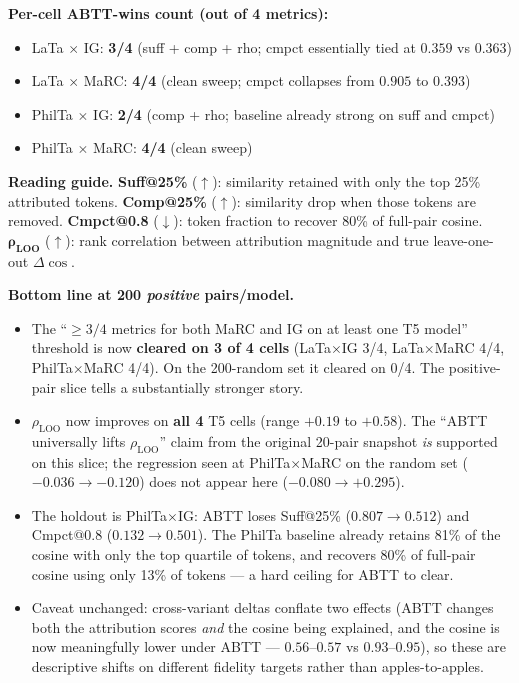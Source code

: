 \documentclass[11pt]{article}
\begin{document}
\vspace{0.4em}

\noindent\textbf{Per-cell ABTT-wins count (out of 4 metrics):}
\begin{itemize}
\itemsep0em
\item LaTa $\times$ IG: \textbf{3/4} (suff + comp + rho; cmpct essentially tied at $0.359$ vs $0.363$)
\item LaTa $\times$ MaRC: \textbf{4/4} (clean sweep; cmpct collapses from $0.905$ to $0.393$)
\item PhilTa $\times$ IG: \textbf{2/4} (comp + rho; baseline already strong on suff and cmpct)
\item PhilTa $\times$ MaRC: \textbf{4/4} (clean sweep)
\end{itemize}

\noindent\textbf{Reading guide.}
\textbf{Suff@25\%} ($\uparrow$): similarity retained with only the top 25\% attributed tokens.
\textbf{Comp@25\%} ($\uparrow$): similarity drop when those tokens are removed.
\textbf{Cmpct@0.8} ($\downarrow$): token fraction to recover 80\% of full-pair cosine.
$\boldsymbol{\rho_{\text{LOO}}}$ ($\uparrow$): rank correlation between attribution magnitude and true leave-one-out $\Delta\cos$.

\vspace{0.4em}

\noindent\textbf{Bottom line at 200 \emph{positive} pairs/model.}
\begin{itemize}
\itemsep0em
\item The ``$\geq 3/4$ metrics for both MaRC and IG on at least one T5 model'' threshold is now \textbf{cleared on 3 of 4 cells} (LaTa$\times$IG 3/4, LaTa$\times$MaRC 4/4, PhilTa$\times$MaRC 4/4). On the 200-random set it cleared on 0/4. The positive-pair slice tells a substantially stronger story.
\item $\rho_{\text{LOO}}$ now improves on \textbf{all 4} T5 cells (range $+0.19$ to $+0.58$). The ``ABTT universally lifts $\rho_{\text{LOO}}$'' claim from the original 20-pair snapshot \emph{is} supported on this slice; the regression seen at PhilTa$\times$MaRC on the random set ($-0.036 \to -0.120$) does not appear here ($-0.080 \to +0.295$).
\item The holdout is PhilTa$\times$IG: ABTT loses Suff@25\% ($0.807 \to 0.512$) and Cmpct@0.8 ($0.132 \to 0.501$). The PhilTa baseline already retains 81\% of the cosine with only the top quartile of tokens, and recovers 80\% of full-pair cosine using only 13\% of tokens --- a hard ceiling for ABTT to clear.
\item Caveat unchanged: cross-variant deltas conflate two effects (ABTT changes both the attribution scores \emph{and} the cosine being explained, and the cosine is now meaningfully lower under ABTT --- $0.56$--$0.57$ vs $0.93$--$0.95$), so these are descriptive shifts on different fidelity targets rather than apples-to-apples.
\end{itemize}
\end{document}
